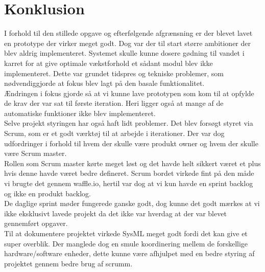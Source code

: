 \chapter{Konklusion}
I forhold til den stillede opgave og efterfølgende afgrænsning er der blevet lavet en prototype der virker meget godt. Dog var der til start større ambitioner der blev aldrig implementeret. Systemet skulle kunne dosere gødning til vandet i karret for at give optimale vækstforhold et sådant modul blev ikke implementeret. Dette var grundet tidspres og tekniske problemer, som nødvendiggjorde at fokus blev lagt på den basale funktionalitet. \\ Ændringen i fokus gjorde så at vi kunne lave prototypen som kom til at opfylde de krav der var sat til første iteration. Heri ligger også at mange af de automatiske funktioner ikke blev implementeret. \\
Selve projekt styringen har også haft lidt problemer. Det blev forsøgt styret via Scrum, som er et godt værktøj til at arbejde i iterationer. Der var dog udfordringer i forhold til hvem der skulle være produkt owner og hvem der skulle være Scrum master. \\
Rollen som Scrum master kørte meget løst og det havde helt sikkert været et plus hvis denne havde været bedre defineret. Scrum bordet virkede fint på den måde vi brugte det gennem waffle.io, hertil var dog at vi kun havde en sprint backlog og ikke en produkt backlog.\\
De daglige sprint møder fungerede ganske godt, dog kunne det godt mærkes at vi ikke eksklusivt lavede projekt da det ikke var hverdag at der var blevet gennemført opgaver. \\
Til at dokumentere projektet virkede SysML meget godt fordi det kan give et super overblik. Der manglede dog en smule koordinering mellem de forskellige hardware/software enheder, dette kunne være afhjulpet med en bedre styring af projektet gennem bedre brug af scrumm.\\\\\\\\\\




